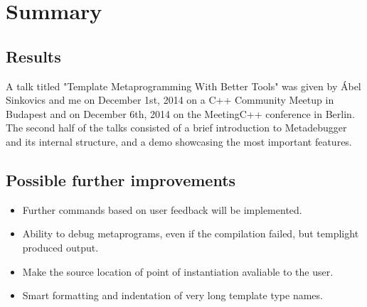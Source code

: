 
\chapter{Summary}

\section{Results}

A talk titled "Template Metaprogramming With Better Tools" was given by Ábel
Sinkovics and me on December 1st, 2014 on a C++ Community
Meetup\cite{cpp-meetup} in Budapest and on December 6th, 2014 on the
MeetingC++ conference\cite{meeting-cpp} in Berlin. The second half of the talks
consisted of a brief introduction to Metadebugger and its internal structure,
and a demo showcasing the most important features.

\section{Possible further improvements}

\begin{itemize}
    \item
        Further commands based on user feedback will be implemented.
    \item
        Ability to debug metaprograms, even if the compilation failed, but
        templight produced output.
    \item
        Make the source location of point of instantiation avaliable to the
        user.
    \item
        Smart formatting and indentation of very long template type names.
\end{itemize}

